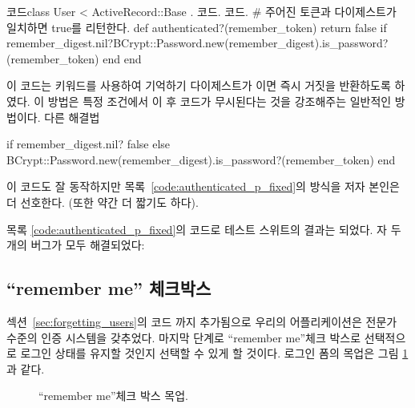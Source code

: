 {{\begin{codelisting}
\begin{code} 코드class User < ActiveRecord::Base . 코드. 코드. # 주어진 토큰과 다이제스트가 일치하면 true를 리턴한다. def authenticated?(remember_token) return false if remember_digest.nil?BCrypt::Password.new(remember_digest).is_password?(remember_token) end end \end{code} \end{codelisting} 

\noindent 이 코드는  키워드를 사용하여 기억하기 다이제스트가 이면 즉시 거짓을 반환하도록 하였다. 이 방법은 특정 조건에서 이 후 코드가 무시된다는 것을 강조해주는 일반적인 방법이다. 다른 해결법 

\begin{code} if remember_digest.nil? false else BCrypt::Password.new(remember_digest).is_password?(remember_token) end \end{code} 

\noindent 이 코드도 잘 동작하지만 목록~\ref{code:authenticated_p_fixed}의 방식을 저자 본인은 더 선호한다.  (또한 약간 더 짧기도 하다). 

목록 \ref{code:authenticated_p_fixed}의 코드로 테스트 스위트의 결과는  되었다. 자 두개의 버그가 모두 해결되었다: 

\begin{codelisting}  

 \end{codelisting} 

\subsection{``remember me'' 체크박스} \label{sec:remember_me_checkbox} 

섹션~\ref{sec:forgetting_users}의 코드 까지 추가됨으로 우리의 어플리케이션은 전문가 수준의 인증 시스템을 갖추었다. 마지막 단계로 ``remember me''체크 박스로 선택적으로 로그인 상태를 유지할 것인지 선택할 수 있게 할 것이다. 로그인 폼의 목업은 그림 \ref{fig:login_remember_me_mockup}과 같다. 

\begin{figure} \begin{center}  \end{center} \caption{``remember me''체크 박스 목업.\label{fig:login_remember_me_mockup}} \end{figure} 

}}
